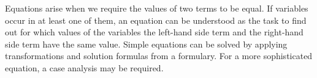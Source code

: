 





\begin{MSectionStart}

Equations arise when we require the values of two terms to be equal. If variables occur in at least one of them, an equation can be understood as the task to find out for which values
of the variables the left-hand side term and the right-hand side term have the same value.
Simple equations can be solved by 
applying transformations and solution formulas from a formulary. For a more sophisticated equation, a case analysis may be required. 



\MModstartBox
\end{MSectionStart}


